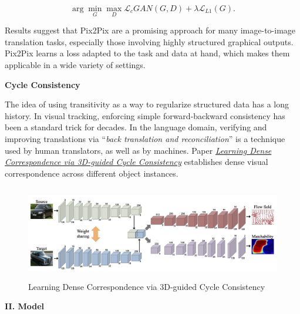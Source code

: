 \documentclass[a4paper]{article}
\begin{document}
{\begin{equation}
\arg \mathop{\min}_{G}\mathop{\max}_{D}\mathcal{L}_c GAN(G,D)+\lambda \mathcal{L}_{L1}(G).
\end{equation}
\vspace{2mm}

Results suggest that \textsf{Pix2Pix} are a promising approach for many image-to-image translation tasks, especially those involving highly structured graphical outputs. \textsf{Pix2Pix} learns a loss adapted to the task and data at hand, which makes them applicable in a wide variety of settings.

}


\vspace{5mm}
\begin{center}
\large\textbf{Cycle Consistency} \\
\end{center}

\large{
The idea of using transitivity as a way to regularize structured data has a long history. In visual tracking, enforcing simple forward-backward consistency has been a standard trick for decades. In the language domain, verifying and improving translations via “\emph{back translation and reconciliation}” is a technique used by human translators, as well as by machines. Paper \href{http://openaccess.thecvf.com/content_cvpr_2016/papers/Zhou_Learning_Dense_Correspondence_CVPR_2016_paper.pdf}{\emph{Learning Dense Correspondence via 3D-guided Cycle Consistency}} establishes dense visual correspondence across different object instances.}

\vspace{3mm}
\begin{figure}[H]
\centering
\includegraphics[width=12.5cm,height=4.1cm]{cycleconsistence.png}
\caption{Learning Dense Correspondence via 3D-guided Cycle Consistency}
\end{figure}
\vspace{2mm}

\clearpage

\vspace{5mm}
\begin{center}
\LARGE\textbf{II. Model} \\
\end{center}
\vspace{2mm}
\end{document}
